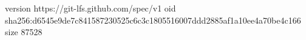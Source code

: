 version https://git-lfs.github.com/spec/v1
oid sha256:d6545e9de7c841587230525c6c3c1805516007ddd2885af1a10ee4a70be4c166
size 87528
